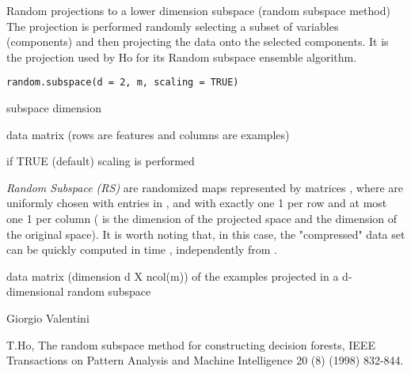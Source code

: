 \documentclass{article}
\begin{document}
\begin{Description}\relax
Random projections to a lower dimension subspace (random subspace method)
The projection is performed randomly selecting a subset of variables (components) and then projecting 
the data onto the selected components.
It is the projection used by Ho for its Random subspace ensemble algorithm.
\end{Description}
\begin{Usage}
\begin{verbatim}
random.subspace(d = 2, m, scaling = TRUE)
\end{verbatim}
\end{Usage}
\begin{Arguments}
\begin{ldescription}
\item[\code{d}] subspace dimension 
\item[\code{m}] data matrix (rows are features and columns are examples) 
\item[\code{scaling}] if TRUE (default) scaling is performed 
\end{ldescription}
\end{Arguments}
\begin{Details}\relax
\emph{ Random Subspace (RS)} are randomized maps represented by  matrices , where  are uniformly chosen with entries in , 
and with exactly one 1 per row and at most one 1 per column ( is the
dimension of the projected space and  the dimension of the original space).
It is worth noting that, in this case, 
the "compressed" data set  can be quickly computed in  time , independently from 
.
\end{Details}
\begin{Value}
data matrix (dimension d X ncol(m)) of the examples projected in a d-dimensional random subspace
\end{Value}
\begin{Author}\relax
Giorgio Valentini 
\end{Author}
\begin{References}\relax
T.Ho, The random subspace method for constructing decision forests, IEEE
Transactions on Pattern Analysis and Machine Intelligence 20 (8) (1998)
832-844.
\end{References}
\end{document}
